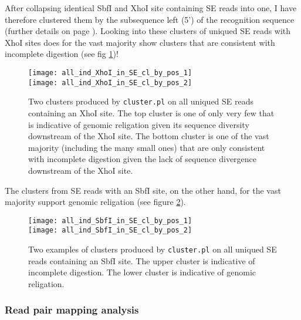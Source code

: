 \documentclass[a4paper,12pt,times,authoryear,twoside,print,index]{Classes/PhDThesisPSnPDF}\usepackage[]{graphicx}\usepackage[]{color}
\begin{document}
After collapsing identical SbfI and XhoI site containing SE reads into one, I have therefore clustered them by the subsequence left (5') of the recognition sequence (further details on page \pageref{cluster_analysis}).
Looking into these clusters of uniqued SE reads with XhoI sites does for the vast majority show clusters that are consistent with incomplete digestion (see fig \ref{all_ind_XhoI_in_SE_cl_by_pos})!
%
\begin{figure}
\centering
\texttt{[image: all\_ind\_XhoI\_in\_SE\_cl\_by\_pos\_1]}\\
\vspace{10pt}
\texttt{[image: all\_ind\_XhoI\_in\_SE\_cl\_by\_pos\_2]}
\caption{Two clusters produced by \texttt{cluster.pl} on all uniqued SE reads containing an XhoI site. The top cluster is one of only very few that is indicative of genomic religation given its sequence diversity downstream of the XhoI site. The bottom cluster is one of the vast majority (including the many small ones) that are only consistent with incomplete digestion given the lack  of sequence divergence downstream of the XhoI site.}
\label{all_ind_XhoI_in_SE_cl_by_pos}
\end{figure}
%
The clusters from SE reads with an SbfI site, on the other hand, for the vast majority support genomic religation (see figure \ref{all_ind_SbfI_in_SE_cl_by_pos_1}). %
\begin{figure}
\centering
\texttt{[image: all\_ind\_SbfI\_in\_SE\_cl\_by\_pos\_1]}\\
\vspace{10pt}
\texttt{[image: all\_ind\_SbfI\_in\_SE\_cl\_by\_pos\_2]}
\caption{Two examples of clusters produced by \texttt{cluster.pl} on all uniqued SE reads containing an SbfI site. The upper cluster is indicative of incomplete digestion. The lower cluster is indicative of genomic religation.}
\label{all_ind_SbfI_in_SE_cl_by_pos_1}
\end{figure}

\subsubsection{Read pair mapping analysis}
\end{document}
